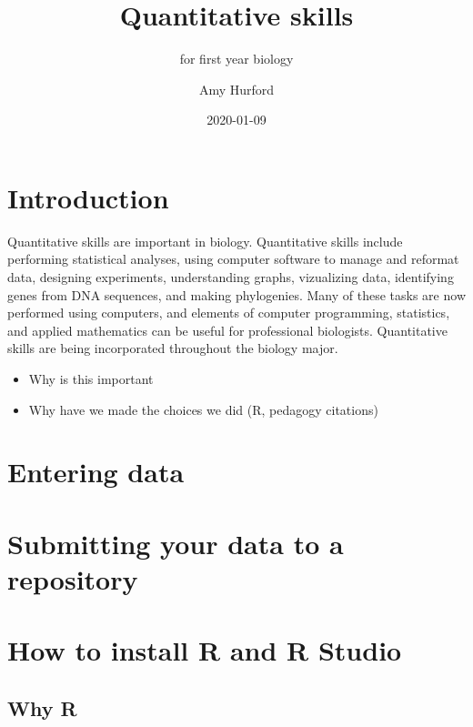 \documentclass[]{book}
\title{Quantitative skills}
\subtitle{for first year biology}
\author{Amy Hurford}
\date{2020-01-09}
\providecommand{\tightlist}{%
  \setlength{\itemsep}{0pt}\setlength{\parskip}{0pt}}
\begin{document}
\maketitle

{
\setcounter{tocdepth}{1}
\tableofcontents
}
\hypertarget{introduction}{%
\chapter{Introduction}\label{introduction}}

Quantitative skills are important in biology. Quantitative skills include performing statistical analyses, using computer software to manage and reformat data, designing experiments, understanding graphs, vizualizing data, identifying genes from DNA sequences, and making phylogenies. Many of these tasks are now performed using computers, and elements of computer programming, statistics, and applied mathematics can be useful for professional biologists. Quantitative skills are being incorporated throughout the biology major.

\begin{itemize}
\tightlist
\item
  Why is this important
\item
  Why have we made the choices we did (R, pedagogy citations)
\end{itemize}

\hypertarget{entering-data}{%
\chapter{Entering data}\label{entering-data}}

\hypertarget{submitting-your-data-to-a-repository}{%
\chapter{Submitting your data to a repository}\label{submitting-your-data-to-a-repository}}

\hypertarget{how-to-install-r-and-r-studio}{%
\chapter{How to install R and R Studio}\label{how-to-install-r-and-r-studio}}

\hypertarget{why-r}{%
\section{Why R}\label{why-r}}
\end{document}
